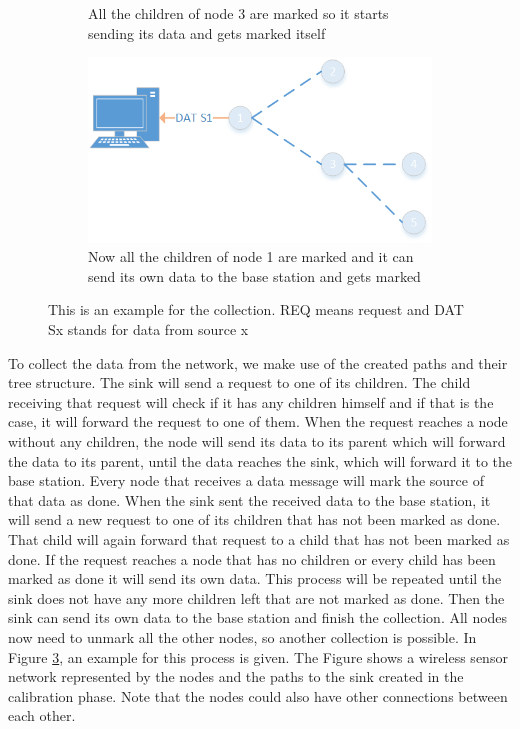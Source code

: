 \begin{figure}[htbp]
\begin{subfigure}[t]{0.4\textwidth}
        \caption{All the children of node 3 are marked so it starts sending its data and gets marked itself}
        \label{fig:coll8}
    \end{subfigure}
    \quad
    \quad
    \begin{subfigure}[t]{0.4\textwidth}
		\centering         
        \includegraphics[scale=0.6]{content/images/Collection/Part9}
        \caption{Now all the children of node 1 are marked and it can send its own data to the base station and gets marked}
        \label{fig:coll9}
    \end{subfigure}
    \label{fig:collection}
    \caption{This is an example for the collection. REQ means request and DAT Sx stands for data from source x}
\end{figure}

To collect the data from the network, we make use of the created paths and their tree structure. The sink will send a request to one of its children. The child receiving that request will check if it has any children himself and if that is the case, it will forward the request to one of them. When the request reaches a node without any children, the node will send its data to its parent which will forward the data to its parent, until the data reaches the sink, which will forward it to the base station. Every node that receives a data message will mark the source of that data as done. When the sink sent the received data to the base station, it will send a new request to one of its children that has not been marked as done. That child will again forward that request to a child that has not been marked as done. If the request reaches a node that has no children or every child has been marked as done it will send its own data. This process will be repeated until the sink does not have any more children left that are not marked as done. Then the sink can send its own data to the base station and finish the collection. All nodes now need to unmark all the other nodes, so another collection is possible. In Figure \ref{fig:collection}, an example for this process is given. The Figure shows a wireless sensor network represented by the nodes and the paths to the sink created in the calibration phase. Note that the nodes could also have other connections between each other.

